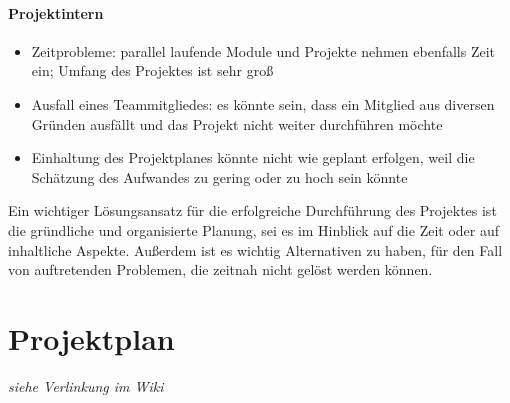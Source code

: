 \documentclass[12pt]{scrartcl}
\begin{document}
\paragraph{Projektintern}
\begin{itemize}
\item Zeitprobleme: parallel laufende Module und Projekte nehmen ebenfalls Zeit ein; Umfang des Projektes ist sehr groß 
\item Ausfall eines Teammitgliedes: es könnte sein, dass ein Mitglied aus diversen Gründen ausfällt und das Projekt nicht weiter durchführen möchte
\item Einhaltung des Projektplanes könnte nicht wie geplant erfolgen, weil die Schätzung des Aufwandes zu gering oder zu hoch sein könnte
\end{itemize}


Ein wichtiger Lösungsansatz für die erfolgreiche Durchführung des Projektes ist die gründliche und organisierte Planung, sei es im Hinblick auf die Zeit oder auf inhaltliche Aspekte.  Außerdem ist es wichtig Alternativen zu haben, für den Fall von auftretenden Problemen, die zeitnah nicht gelöst werden können.


\section{Projektplan}




\emph{siehe Verlinkung im Wiki}
\end{document}
